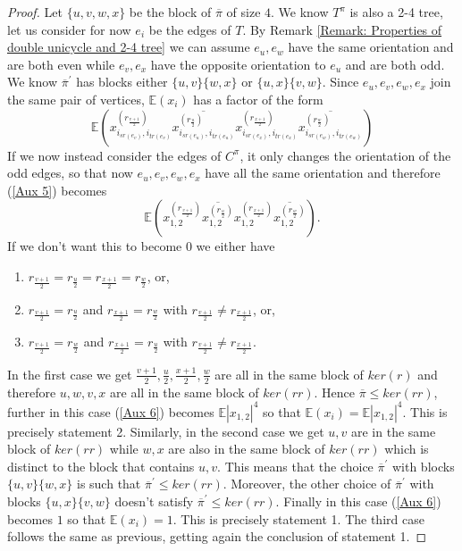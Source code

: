 \documentclass{article}
\theoremstyle{definition}
\newcommand{\E}{\mathbb{E}}
\begin{document}
{\begin{proof}
Let $\{u,v,w,x\}$ be the block of $\overline{\pi}$ of size $4$. We know $T^\pi$ is also a 2-4 tree, let us consider for now $e_i$ be the edges of $T$. By Remark \ref{Remark: Properties of double unicycle and 2-4 tree} we can assume $e_u,e_w$ have the same orientation and are both even while $e_v,e_x$ have the opposite orientation to $e_u$ and are both odd. We know $\overline{\pi}^\prime$ has blocks either $\{u,v\}\{w,x\}$ or $\{u,x\}\{v,w\}$. Since $e_u,e_v,e_w,e_x$ join the same pair of vertices, $\E(x_i)$ has a factor of the form
\begin{equation}\label{Aux 5}
\E\left(x_{i_{sr(e_v)},i_{tr(e_v)}}^{(r_{\frac{v+1}{2}})}\overline{x_{i_{sr(e_u)},i_{tr(e_u)}}^{(r_{\frac{u}{2}})}}x_{i_{sr(e_x)},i_{tr(e_x)}}^{(r_{\frac{x+1}{2}})}\overline{x_{i_{sr(e_w)},i_{tr(e_w)}}^{(r_{\frac{w}{2}})}}\right)
\end{equation}
If we now instead consider the edges of $C^\pi$, it only changes the orientation of the odd edges, so that now $e_u,e_v,e_w,e_x$ have all the same orientation and therefore (\ref{Aux 5}) becomes
\begin{equation}\label{Aux 6}
\E(x_{1,2}^{(r_{\frac{v+1}{2}})}\overline{x_{1,2}^{(r_{\frac{u}{2}})}}x_{1,2}^{(r_{\frac{x+1}{2}})}\overline{x_{1,2}^{(r_{\frac{w}{2}})}}).
\end{equation}
If we don't want this to become $0$ we either have
\begin{enumerate}
    \item $r_{\frac{v+1}{2}}=r_{\frac{u}{2}}=r_{\frac{x+1}{2}}=r_{\frac{w}{2}}$, or,
    \item $r_{\frac{v+1}{2}}=r_{\frac{u}{2}}$ and $r_{\frac{x+1}{2}}=r_{\frac{w}{2}}$ with $r_{\frac{v+1}{2}}\neq r_{\frac{x+1}{2}}$, or,
    \item $r_{\frac{v+1}{2}}=r_{\frac{w}{2}}$ and $r_{\frac{x+1}{2}}=r_{\frac{u}{2}}$ with $r_{\frac{v+1}{2}}\neq r_{\frac{x+1}{2}}$.
\end{enumerate}
In the first case we get $\frac{v+1}{2},\frac{u}{2},\frac{x+1}{2},\frac{w}{2}$ are all in the same block of $ker(r)$ and therefore $u,w,v,x$ are all in the same block of $ker(rr)$. Hence $\overline{\pi}\leq ker(rr)$, further in this case (\ref{Aux 6}) becomes $\E|x_{1,2}|^4$ so that $\E(x_i)=\E|x_{1,2}|^4$. This is precisely statement 2. Similarly, in the second case we get $u,v$ are in the same block of $ker(rr)$ while $w,x$ are also in the same block of $ker(rr)$ which is distinct to the block that contains $u,v$. This means that the choice $\overline{\pi}^\prime$ with blocks $\{u,v\}\{w,x\}$ is such that $\overline{\pi}^\prime \leq ker(rr)$. Moreover, the other choice of $\overline{\pi}^\prime$ with blocks $\{u,x\}\{v,w\}$ doesn't satisfy $\overline{\pi}^\prime \leq ker(rr)$. Finally in this case (\ref{Aux 6}) becomes $1$ so that $\E(x_i)=1$. This is precisely statement 1. The third case follows the same as previous, getting again the conclusion of statement 1.
\end{proof}

}
\end{document}
